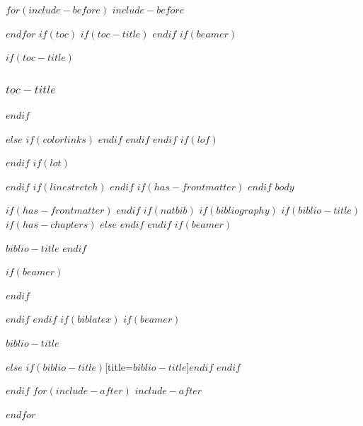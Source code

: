\documentclass[
$if(fontsize)$
  $fontsize$,
$endif$
$if(papersize)$
  $papersize$paper,
$endif$
$if(beamer)$
  ignorenonframetext,
$if(handout)$
  handout,
$endif$
$if(aspectratio)$
  aspectratio=$aspectratio$,
$endif$
$endif$
$for(classoption)$
  $classoption$$sep$,
$endfor$
]{$documentclass$}
\newif\ifbibliography
\begin{document}
$for(include-before)$
$include-before$

$endfor$
$if(toc)$
$if(toc-title)$
\renewcommand*\contentsname{$toc-title$}
$endif$
$if(beamer)$
\begin{frame}[allowframebreaks]
$if(toc-title)$
  \frametitle{$toc-title$}
$endif$
  \tableofcontents[hideallsubsections]
\end{frame}
$else$
{
$if(colorlinks)$
\hypersetup{linkcolor=$if(toccolor)$$toccolor$$else$$endif$}
$endif$
\setcounter{tocdepth}{$toc-depth$}
\tableofcontents
}
$endif$
$endif$
$if(lof)$
\listoffigures
$endif$
$if(lot)$
\listoftables
$endif$
$if(linestretch)$
$endif$
$if(has-frontmatter)$
\mainmatter
$endif$
$body$

$if(has-frontmatter)$
\backmatter
$endif$
$if(natbib)$
$if(bibliography)$
$if(biblio-title)$
$if(has-chapters)$
\renewcommand\bibname{$biblio-title$}
$else$
\renewcommand\refname{$biblio-title$}
$endif$
$endif$
$if(beamer)$
\begin{frame}[allowframebreaks]{$biblio-title$}
  \bibliographytrue
$endif$
  
$if(beamer)$
\end{frame}
$endif$

$endif$
$endif$
$if(biblatex)$
$if(beamer)$
\begin{frame}[allowframebreaks]{$biblio-title$}
  \bibliographytrue
  \printbibliography[heading=none]
\end{frame}
$else$
\printbibliography$if(biblio-title)$[title=$biblio-title$]$endif$
$endif$

$endif$
$for(include-after)$
$include-after$

$endfor$
\end{document}
